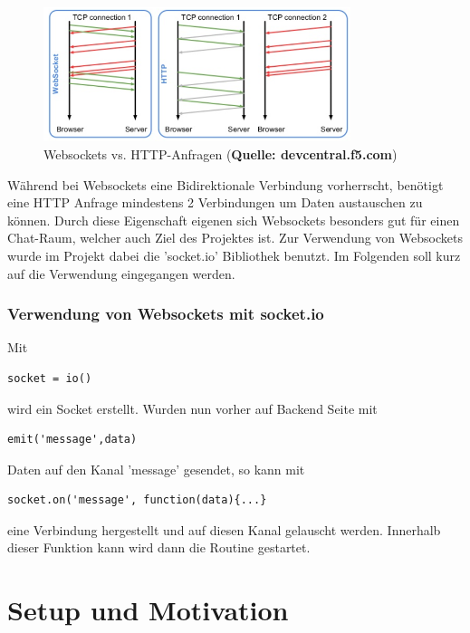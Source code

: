 \documentclass[
	12pt,								%
	DIV10,
	a4paper,         		%
	oneside,						%
	parskip=half,				%
	headings=normal,			%
	listof=totoc,					%
	bibliography=totoc,						%
	index=totoc,						%
	final								%
]{scrartcl}
\begin{document}
\begin{figure}[H]
\centering
\includegraphics[width=0.8\textwidth]{socket}
\caption{Websockets vs. HTTP-Anfragen (\textbf{Quelle: devcentral.f5.com})}
\label{setup2}
\end{figure}
Während bei Websockets eine Bidirektionale Verbindung vorherrscht, benötigt eine HTTP Anfrage mindestens 2 Verbindungen um Daten austauschen zu können. 
Durch diese Eigenschaft eigenen sich Websockets besonders gut für einen Chat-Raum, welcher auch Ziel des Projektes ist.
Zur Verwendung von Websockets wurde im Projekt dabei die 'socket.io' Bibliothek benutzt. Im Folgenden soll kurz auf die Verwendung eingegangen werden.

\subsubsection*{Verwendung von Websockets mit socket.io}
Mit 
\begin{lstlisting}
socket = io()
\end{lstlisting}
wird ein Socket erstellt. Wurden nun vorher auf Backend Seite mit 
\begin{lstlisting}
emit('message',data)
\end{lstlisting}
Daten auf den Kanal 'message' gesendet, so kann mit 
\begin{lstlisting}
socket.on('message', function(data){...}
\end{lstlisting}
eine Verbindung hergestellt und auf diesen Kanal gelauscht werden. Innerhalb dieser Funktion kann wird dann die Routine gestartet.



\newpage



\section{Setup und Motivation}
\end{document}

